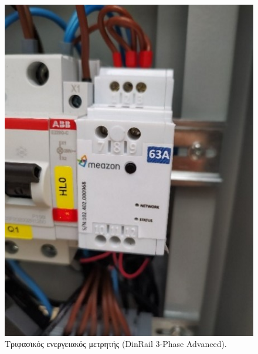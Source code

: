 \documentclass[12pt, a4paper]{report} %
\newcommand{\english}{\foreignlanguage{english}}
\begin{document}
\begin{figure}[ht]%
    \centering
    \includegraphics[scale=1]{Figures/DinRail.jpg}
    \caption{Tριφασικός ενεργειακός μετρητής (\english{DinRail 3-Phase Advanced}).}
    \label{fig_dinrail}
\end{figure}
\end{document}
